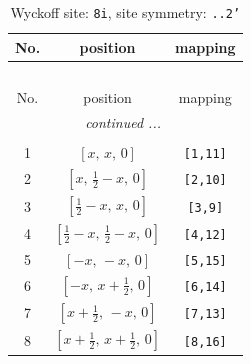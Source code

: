\documentclass[fleqn,8pt]{jsarticle}
\begin{document}
\renewcommand{\arraystretch}{1.2}
\begin{longtable}{ccc}
\caption{Wyckoff site: {\tt 8i}, site symmetry: {\tt ..2'}}
 \\
 \hline \hline
No. & position & mapping \\ \hline \endfirsthead

\multicolumn{2}{l}{\tablename\ \thetable{}} \\
 \hline \hline
No. & position & mapping \\ \hline \endhead

 \hline \hline
\multicolumn{2}{r}{\footnotesize\it continued ...} \\ \endfoot

 \hline \hline
\multicolumn{2}{r}{} \\ \endlastfoot

1 & $\left[ x,\, x,\, 0 \right]$ & {\tt [1,11]} \\ \hline
2 & $\left[ x,\, \frac{1}{2} - x,\, 0 \right]$ & {\tt [2,10]} \\ \hline
3 & $\left[ \frac{1}{2} - x,\, x,\, 0 \right]$ & {\tt [3,9]} \\ \hline
4 & $\left[ \frac{1}{2} - x,\, \frac{1}{2} - x,\, 0 \right]$ & {\tt [4,12]} \\ \hline
5 & $\left[ - x,\, - x,\, 0 \right]$ & {\tt [5,15]} \\ \hline
6 & $\left[ - x,\, x + \frac{1}{2},\, 0 \right]$ & {\tt [6,14]} \\ \hline
7 & $\left[ x + \frac{1}{2},\, - x,\, 0 \right]$ & {\tt [7,13]} \\ \hline
8 & $\left[ x + \frac{1}{2},\, x + \frac{1}{2},\, 0 \right]$ & {\tt [8,16]} \\
\end{longtable}
\renewcommand{\arraystretch}{1.2}
\end{document}
